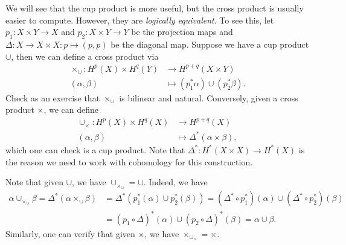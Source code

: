 \begin{remark}
  We will see that the cup product is more
  useful, but the cross product is usually easier
  to compute. However, they are \emph{logically equivalent}.
  To see this, let
  $p_1 : X \times Y \to X$ and $p_2 : X \times Y \to Y$
  be the projection maps and
  $\Delta : X \to X \times X : p \mapsto (p, p)$
  be the diagonal map. Suppose we have a
  cup product $\cup$, then we can define
  a cross product via
  \begin{align*}
    \times_{\cup} : H^p(X) \times H^q(Y)
    &\longrightarrow H^{p + q}(X \times Y) \\
    (\alpha, \beta)
    &\longmapsto (p_1^* \alpha) \cup (p_2^* \beta).
  \end{align*}
  Check as an exercise that
  $\times_{\cup}$ is bilinear and natural.
  Conversely, given a cross product $\times$,
  we can define
  \begin{align*}
    \cup_\times : H^p(X) \times H^q(X)
    &\longrightarrow H^{p + q}(X) \\
    (\alpha, \beta)
    &\longmapsto \Delta^*(\alpha \times \beta),
  \end{align*}
  which one can check is a cup product.
  Note that $\Delta^* : H^*(X \times X) \to H^*(X)$
  is the reason we need to work with
  cohomology for this construction.
\end{remark}

\begin{remark}
  Note that given $\cup$, we have
  $\cup_{\times_{\cup}} = \cup$. Indeed, we have
  \begin{align*}
    \alpha \cup_{\times_{\cup}} \beta
    = \Delta^*(\alpha \times_{\cup} \beta)
    &= \Delta^*(p_1^*(\alpha) \cup p_2^*(\beta))
    = (\Delta^* \circ p_1^*)(\alpha) \cup (\Delta^* \circ p_2^*)(\beta) \\
    &= (p_1 \circ \Delta)^*(\alpha) \cup (p_2 \circ \Delta)^*(\beta)
    = \alpha \cup \beta.
  \end{align*}
  Similarly, one can verify that
  given $\times$, we have $\times_{\cup_{\times}} = \times$.
\end{remark}

